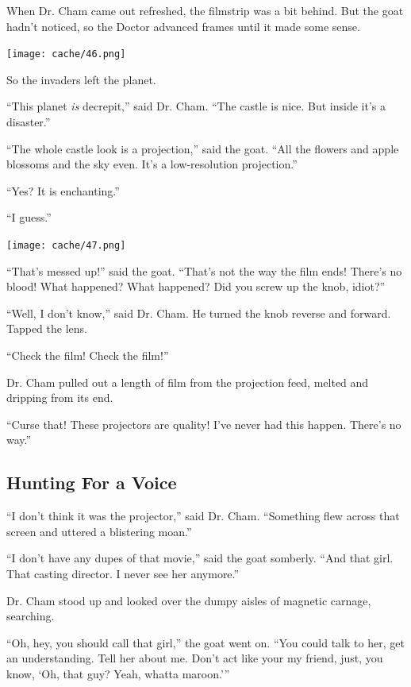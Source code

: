 \documentclass[12pt,twoside]{report}
\begin{document}
When Dr. Cham came out refreshed, the filmstrip was a bit behind.  But
the goat hadn't noticed, so the Doctor advanced frames until it made
some sense.

\newpage

	\texttt{[image: cache/46.png]}

So the invaders left the planet.

``This planet {\em is} decrepit,'' said Dr. Cham.  ``The castle is
nice.  But inside it's a disaster.''

``The whole castle look is a projection,'' said the goat.  ``All the
flowers and apple blossoms and the sky even.  It's a low-resolution
projection.''

``Yes?  It is enchanting.''

``I guess.''

	\texttt{[image: cache/47.png]}

``That's messed up!'' said the goat.  ``That's not the way the film
        ends! There's no blood!  What happened?  What happened?  Did
        you screw up the knob, idiot?''

``Well, I don't know,'' said Dr. Cham.  He turned the knob reverse and
        forward. Tapped the lens.

``Check the film!  Check the film!''

Dr. Cham pulled out a length of film from the projection feed, melted
and dripping from its end.

``Curse that!  These projectors are quality!  I've never had this
happen.  There's no way.''



\subsection{Hunting For a Voice}



``I don't think it was the projector,'' said Dr. Cham.  ``Something
flew across that screen and uttered a blistering moan.''

``I don't have any dupes of that movie,'' said the goat somberly.
``And that girl.  That casting director.  I never see her anymore.''

Dr. Cham stood up and looked over the dumpy aisles of magnetic
carnage, searching.

``Oh, hey, you should call that girl,'' the goat went on. ``You could
talk to her, get an understanding. Tell her about me.  Don't act like
your my friend, just, you know, `Oh, that guy? Yeah, whatta maroon.'''
\end{document}
